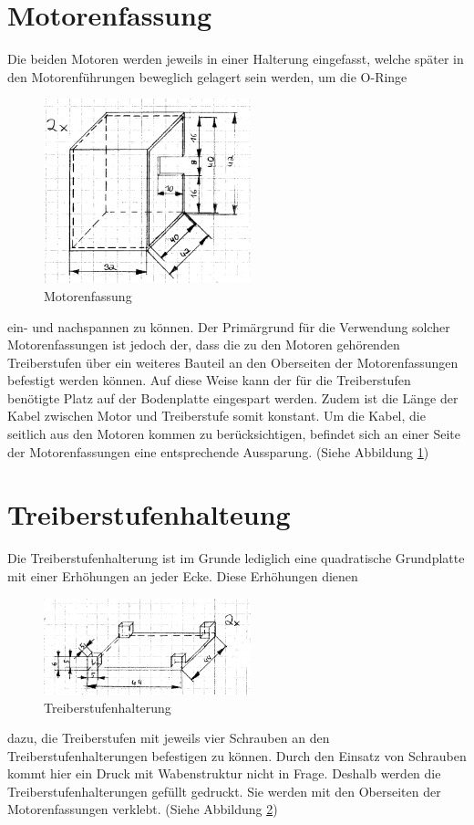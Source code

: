 \section{Motorenfassung}
Die beiden Motoren werden jeweils in einer Halterung eingefasst, welche später in den Motorenführungen beweglich gelagert sein werden, um die O-Ringe 
\begin{figure}
	\includegraphics[width=6cm,angle=0]{content/pictures/motorenfassung.png}
	\caption{Motorenfassung}
	\label{fig:motorenfassung}
\end{figure}
ein- und nachspannen zu können. Der Primärgrund für die Verwendung solcher Motorenfassungen ist jedoch der, dass die zu den Motoren gehörenden Treiberstufen über ein weiteres Bauteil an den Oberseiten der Motorenfassungen befestigt werden können. Auf diese Weise kann der für die Treiberstufen benötigte Platz auf der Bodenplatte eingespart werden. Zudem ist die Länge der Kabel zwischen Motor und Treiberstufe somit konstant. Um die Kabel, die seitlich aus den Motoren kommen zu berücksichtigen, befindet sich an einer Seite der Motorenfassungen eine entsprechende Aussparung. (Siehe Abbildung \ref{fig:motorenfassung})

\section{Treiberstufenhalteung}
Die Treiberstufenhalterung ist im Grunde lediglich eine quadratische Grundplatte mit einer Erhöhungen an jeder Ecke. Diese Erhöhungen dienen
\begin{figure}
	\includegraphics[width=6cm,angle=0]{content/pictures/treiberstufenhalterung.png}
	\caption{Treiberstufenhalterung}
	\label{fig:treiberstufenhalterung}
\end{figure}
dazu, die Treiberstufen mit jeweils vier Schrauben an den Treiberstufenhalterungen befestigen zu können. Durch den Einsatz von Schrauben kommt hier ein Druck mit Wabenstruktur nicht in Frage. Deshalb werden die Treiberstufenhalterungen gefüllt gedruckt. Sie werden mit den Oberseiten der Motorenfassungen verklebt. (Siehe Abbildung \ref{fig:treiberstufenhalterung})

